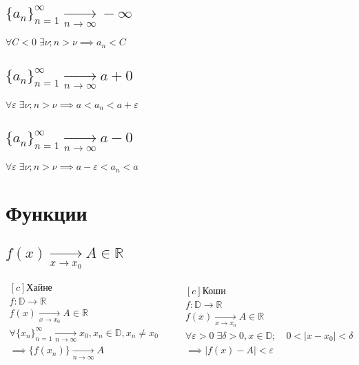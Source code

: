 \documentclass{article}
\newcommand{\pto}[2]{\xrightarrow[#1 \to #2]{}}
\newcommand{\xto}[1]{\pto{x}{#1}}
\newcommand{\nto}[0]{\pto{n}{\infty}}
\newcommand{\R}[0]{\mathbb{R}}
\newcommand{\D}[0]{\mathbb{D}}
\newcommand{\spc}[0]{\quad}
\newcommand{\e}[0]{\varepsilon}
\newcommand{\seq}[1]{\{#1_n\}_{n=1}^{\infty}}
\begin{document}
    \subsection{\(\seq{a} \nto -\infty\)}
    \(\forall C < 0 \; \exists \nu; n > \nu \implies a_n < C\)
    \subsection{\(\seq{a} \nto a + 0\)}
    \(\forall \e \; \exists \nu; n > \nu \implies a < a_n < a + \e\)
    \subsection{\(\seq{a} \nto a - 0\)}
    \(\forall \e \; \exists \nu; n > \nu \implies a - \e < a_n < a\)
    \section{Функции}
    \subsection{\(f(x) \xto{x_0} A \in \R\)}
    \(
        \begin{aligned}[c]
        \text{Хайне}\\
        f: \D \to \R\\
        f(x) \xto{x_0} A \in \R\\
        \forall \seq{x} \nto x_0, x_n \in \D, x_n \neq x_0\\
        \implies \{f(x_n)\} \nto A 
        \end{aligned}
        \spc\spc
        \begin{aligned}[c]
         \text{Коши}\\
        f: \D \to \R\\
        f(x) \xto{x_0} A \in \R\\
        \forall \e > 0 \; \exists \delta > 0, x \in \D; \spc 0 < |x - x_0| < \delta\\
        \implies |f(x) - A| < \e
        \end{aligned}
    \)
\end{document}
